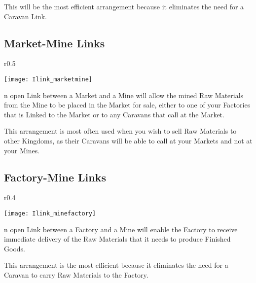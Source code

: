 This will be the most efficient arrangement because it eliminates the need for a Caravan Link.

\clearpage

\subsection{\textsf{Market-Mine Links}}


\begin{wrapfigure}{r}{0.5\textwidth}
    \vspace{-20pt}
    \begin{center}
        \texttt{[image: Ilink\_marketmine]} %
    \end{center}
    \vspace{-10pt}
\end{wrapfigure}

n open Link between a Market and a Mine will allow the mined Raw Materials from the Mine to be placed in the Market for sale, either to one of your Factories that is Linked to the Market or to any Caravans that call at the Market.

This arrangement is most often used when you wish to sell Raw Materials to other Kingdoms, as their Caravans will be able to call at your Markets and not at your Mines.

\subsection{\textsf{Factory-Mine Links}}


\begin{wrapfigure}{r}{0.4\textwidth}
    \vspace{-20pt}
    \begin{center}
        \texttt{[image: Ilink\_minefactory]} %
    \end{center}
    \vspace{-20pt}
\end{wrapfigure}

n open Link between a Factory and a Mine will enable the Factory to receive immediate delivery of the Raw Materials that it needs to produce Finished Goods.

This arrangement is the most efficient because it eliminates the need for a Caravan to carry Raw Materials to the Factory.

